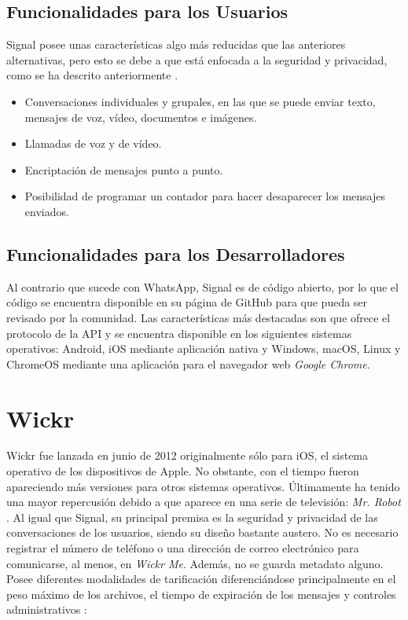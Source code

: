 \newpage

\subsection{Funcionalidades para los Usuarios}
Signal posee unas características algo más reducidas que las anteriores alternativas, pero esto se debe a que está enfocada a la seguridad y privacidad, como se ha descrito anteriormente \cite{Signal2017}.

\begin{itemize}
	\item Conversaciones individuales y grupales, en las que se puede enviar texto, mensajes de voz, vídeo, documentos e imágenes.
	\item Llamadas de voz y de vídeo.
	\item Encriptación de mensajes punto a punto.
	\item Posibilidad de programar un contador para hacer desaparecer los mensajes enviados.
\end{itemize}

\subsection{Funcionalidades para los Desarrolladores}
Al contrario que sucede con WhatsApp, Signal es de código abierto, por lo que el código se encuentra disponible en su página de GitHub para que pueda ser revisado por la comunidad. Las características más destacadas son que ofrece el protocolo de la \acs{API} y se encuentra disponible en los siguientes sistemas operativos: Android, iOS mediante aplicación nativa y Windows, macOS, Linux y ChromeOS mediante una aplicación para el navegador web \textit{Google Chrome}.

\section{Wickr}
\label{sec:wickr}

Wickr fue lanzada en junio de 2012 originalmente sólo para iOS, el sistema operativo de los dispositivos de Apple. No obstante, con el tiempo fueron apareciendo más versiones para otros sistemas operativos. Últimamente ha tenido una mayor repercusión debido a que aparece en una serie de televisión: \textit{Mr. Robot} \cite{Elio2016}. Al igual que Signal, su principal premisa es la seguridad y privacidad de las conversaciones de los usuarios, siendo su diseño bastante austero. No es necesario registrar el número de teléfono o una dirección de correo electrónico para comunicarse, al menos, en \textit{Wickr Me}. Además, no se guarda metadato alguno. Posee diferentes modalidades de tarificación diferenciándose principalmente en el peso máximo de los archivos, el tiempo de expiración de los mensajes y controles administrativos \cite{Wickr2017}:

